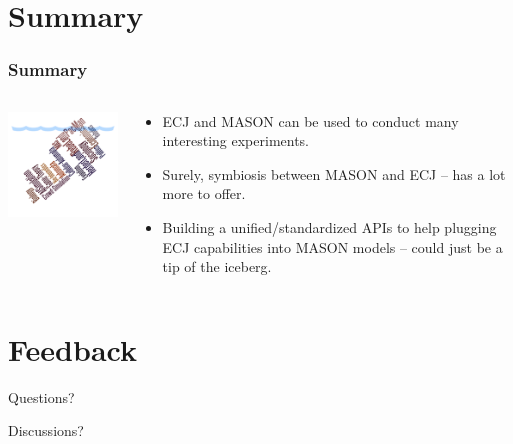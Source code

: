\documentclass{beamer}
\begin{document}
\section{Summary}
\begin{frame}
	\frametitle{Summary}
	\begin{columns}[c]
		\column{2.5in}
			\centering
			\includegraphics[width=2.5in,keepaspectratio]{iceberg.pdf}
		\column{2in}
		\begin{footnotesize}
			\begin{itemize}
				\setlength{\itemsep}{0.30cm}
				\item ECJ and MASON can be used to conduct many interesting experiments.
				\item Surely, symbiosis between MASON and ECJ -- has a lot more to offer.
				\item Building a unified/standardized APIs to help plugging ECJ capabilities into MASON models -- could just be a tip of the iceberg.
			\end{itemize}
		\end{footnotesize}
	\end{columns}
\end{frame} 
\section{Feedback}
	\begin{frame}
		\begin{block}{}
			\Huge{\centerline{Questions?}}
		\end{block}
		\begin{block}{}
			\Huge{\centerline{Discussions?}}
		\end{block}
	\end{frame}
\end{document}
